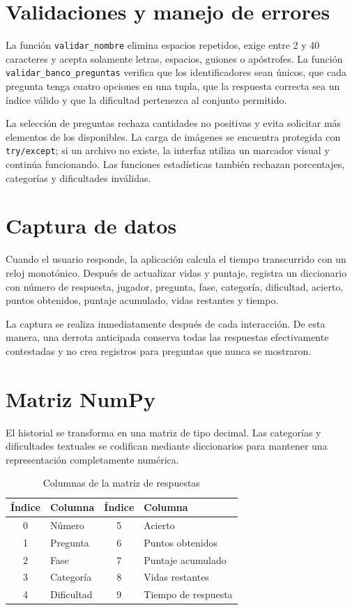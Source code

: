 \documentclass[stu,12pt,a4paper,biblatex,floatsintext]{apa7}
\begin{document}
\section{Validaciones y manejo de errores}

La función \texttt{validar\_nombre} elimina espacios repetidos, exige entre 2 y 40 caracteres y acepta solamente letras, espacios, guiones o apóstrofes. La función \texttt{validar\_banco\_preguntas} verifica que los identificadores sean únicos, que cada pregunta tenga cuatro opciones en una tupla, que la respuesta correcta sea un índice válido y que la dificultad pertenezca al conjunto permitido.

La selección de preguntas rechaza cantidades no positivas y evita solicitar más elementos de los disponibles. La carga de imágenes se encuentra protegida con \texttt{try/except}; si un archivo no existe, la interfaz utiliza un marcador visual y continúa funcionando. Las funciones estadísticas también rechazan porcentajes, categorías y dificultades inválidas.

\section{Captura de datos}

Cuando el usuario responde, la aplicación calcula el tiempo transcurrido con un reloj monotónico. Después de actualizar vidas y puntaje, registra un diccionario con número de respuesta, jugador, pregunta, fase, categoría, dificultad, acierto, puntos obtenidos, puntaje acumulado, vidas restantes y tiempo.

La captura se realiza inmediatamente después de cada interacción. De esta manera, una derrota anticipada conserva todas las respuestas efectivamente contestadas y no crea registros para preguntas que nunca se mostraron.

\section{Matriz NumPy}

El historial se transforma en una matriz de tipo decimal. Las categorías y dificultades textuales se codifican mediante diccionarios para mantener una representación completamente numérica.

\begin{table}[htbp]
  \centering
  \caption{Columnas de la matriz de respuestas}
  \begin{tabular}{clcl}
    \toprule
    \rowcolor{utpAzulClaro}
    \textcolor{utpAzul}{\textbf{Índice}} & \textcolor{utpAzul}{\textbf{Columna}} & \textcolor{utpAzul}{\textbf{Índice}} & \textcolor{utpAzul}{\textbf{Columna}} \\
    \midrule
    0 & Número & 5 & Acierto \\
    1 & Pregunta & 6 & Puntos obtenidos \\
    2 & Fase & 7 & Puntaje acumulado \\
    3 & Categoría & 8 & Vidas restantes \\
    4 & Dificultad & 9 & Tiempo de respuesta \\
    \bottomrule
  \end{tabular}
\end{table}
\end{document}
